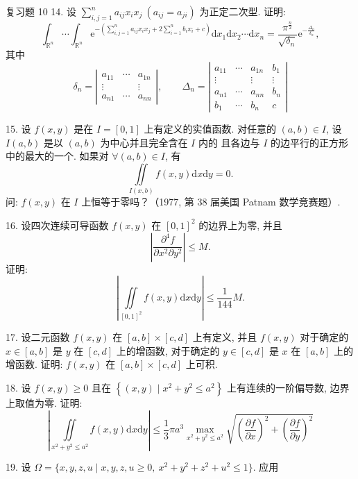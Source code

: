 \begin{exblock}{复习题 10}
14. 设 $\sum\limits_{i,j=1}^{n} a_{ij} x_{i} x_{j}\ (a_{ij} = a_{ji})$ 为正定二次型. 证明:
\[
\int_{\mathbb{R}^{n}} \cdots \int_{\mathbb{R}^{n}}
\mathrm{e}^{-\left( \sum\limits_{i,j=1}^{n} a_{ij} x_{i} x_{j}
+ 2 \sum\limits_{i=1}^{n} b_{i} x_{i} + c \right)}
\mathrm{d}x_{1} \mathrm{d}x_{2} \cdots \mathrm{d}x_{n}
= \frac{\pi^{\frac{n}{2}}}{\sqrt{\delta_{n}}}
\mathrm{e}^{-\frac{\Delta_{n}}{\delta_{n}}},
\]
其中
\[
\delta_{n} = \left| \begin{matrix}
a_{11} & \cdots & a_{1n}\\ \vdots & & \vdots\\ a_{n1} & \cdots & a_{nn}
\end{matrix} \right|,
\qquad
\Delta_{n} = \left| \begin{matrix}
a_{11} & \cdots & a_{1n} & b_{1}\\ \vdots & & \vdots & \vdots\\
a_{n1} & \cdots & a_{nn} & b_{n}\\ b_{1} & \cdots & b_{n} & c
\end{matrix} \right|
\]

15. 设 $f(x, y)$ 是在 $I = [0, 1]$ 上有定义的实值函数.
对任意的 $(a, b) \in I$, 设 $I(a, b)$ 是以 $(a, b)$ 为中心并且完全含在 $I$ 内的
且各边与 $I$ 的边平行的正方形中的最大的一个.
如果对 $\forall (a, b) \in I$, 有
\[
\iint\limits_{I(x,b)} f(x,y) \mathrm{d}x\mathrm{d}y = 0.
\]
问: $f(x,y)$ 在 $I$ 上恒等于零吗？（1977, 第 38 届美国 Patnam 数学竞赛题）.

16. 设四次连续可导函数 $f(x, y)$ 在 $[0, 1]^{2}$ 的边界上为零, 并且
\[
\left| \frac{\partial^{4} f}{\partial x^{2} \partial y^{2}} \right| \leqslant M.
\]
证明:
\[
\left| \iint\limits_{[0,1]^{2}} f(x,y) \mathrm{d}x\mathrm{d}y \right| \leqslant \frac{1}{144} M.
\]

17. 设二元函数 $f(x, y)$ 在 $[a, b] \times [c, d]$ 上有定义,
并且 $f(x, y)$ 对于确定的 $x \in [a, b]$ 是 $y$ 在 $[c, d]$ 上的增函数,
对于确定的 $y \in [c, d]$ 是 $x$ 在 $[a, b]$ 上的增函数.
证明: $f(x, y)$ 在 $[a, b] \times [c, d]$ 上可积.

18. 设 $f(x,y) \geqslant 0$ 且在 $\left\{ (x,y) \mid x^{2}+y^{2} \leqslant a^{2} \right\}$
上有连续的一阶偏导数, 边界上取值为零. 证明:
\[
\left| \iint\limits_{x^{2}+y^{2} \leqslant a^{2}} f(x,y) \mathrm{d}x\mathrm{d}y \right|
\leqslant \frac{1}{3} \pi a^{3}
\max_{x^{2}+y^{2} \leqslant a^{2}}
\sqrt{ \left( \frac{\partial f}{\partial x} \right)^{2}
+ \left( \frac{\partial f}{\partial y} \right)^{2} }
\]

19. 设 $\Omega = \{ x,y,z,u \mid x,y,z,u \geqslant 0,\ x^{2}+y^{2}+z^{2}+u^{2} \leqslant 1 \}$.
应用


\end{exblock}
